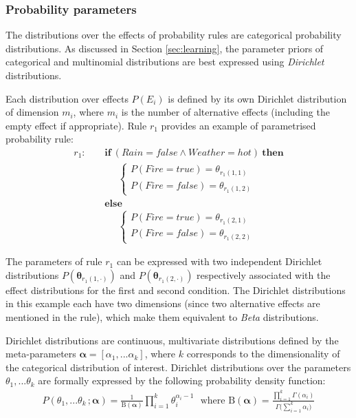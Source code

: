 \subsubsection*{Probability parameters}

The distributions over the effects of probability rules are categorical probability distributions.  As discussed in Section \ref{sec:learning}, the parameter priors of categorical and multinomial distributions are best expressed using \textit{Dirichlet} distributions. 

Each distribution over effects $P(E_i)$ is defined by its own Dirichlet distribution of dimension $m_i$, where $m_i$ is the number of alternative effects (including the empty effect if appropriate).  Rule $r_{1}$ provides an example of parametrised probability rule: 
\begin{align*}
r_{1}: \ \ \ \ \ & \textbf{if} \ (\mathit{Rain}\!=\!\mathit{false} \land \mathit{Weather}\!=\!\mathit{hot}) \ \textbf{then} \\
& \;\;\;\;\;  \begin{cases}
 P(\mathit{Fire}\!=\!\mathit{true}) = \theta_{r_{1}(1,1)} \\ 
P(\mathit{Fire}\!=\!\mathit{false}) = \theta_{r_{1}(1,2)}
\end{cases} \\ 
& \textbf{else} \\
& \;\;\;\;\; \begin{cases}
P(\mathit{Fire}\!=\!\mathit{true}) = \theta_{r_{1}(2,1)} \\
P(\mathit{Fire}\!=\!\mathit{false}) = \theta_{r_{1}(2,2)}
\end{cases} 
\end{align*}


The parameters of rule $r_{1}$ can be expressed with two independent Dirichlet distributions $P(\boldsymbol\theta_{r_{1}(1,\cdot)})$ and $P(\boldsymbol\theta_{r_{1}(2,\cdot)})$ respectively associated with the effect distributions for the first and second condition.  The Dirichlet distributions in this example each have two dimensions (since two alternative effects are mentioned in the rule), which make them equivalent to \textit{Beta} distributions. 

Dirichlet distributions are continuous, multivariate distributions defined by the meta-parameters $\boldsymbol\alpha = [\alpha_1,... \alpha_k]$, where $k$ corresponds to the dimensionality of the categorical distribution of interest.  Dirichlet distributions over the parameters $\theta_1,... \theta_k$ are formally expressed by the following probability density function:
\begin{align}
P(\theta_1,...\theta_k\,; \boldsymbol\alpha) = \frac{1}{\mathrm{B}(\boldsymbol\alpha)} \prod_{i=1}^k \theta_i^{\alpha_i - 1} \ \ \ \text{where } \mathrm{B}(\boldsymbol\alpha) = \frac{\prod_{i=1}^k \Gamma(\alpha_i)}{\Gamma\bigl(\sum_{i=1}^k \alpha_i\bigr)}
\end{align}

